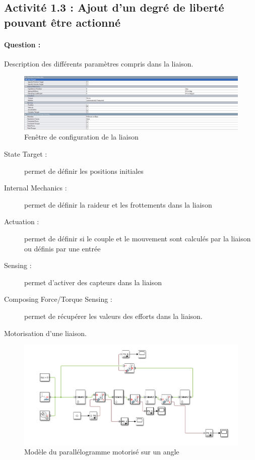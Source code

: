 \documentclass[12pt,a4paper]{article}
\begin{document}
\subsection{Activité 1.3 : Ajout d'un degré de liberté pouvant être actionné}
\paragraph{Question  : } Description des différents paramètres compris dans la liaison.
\begin{figure}[h!]
\centering
\includegraphics[width=.9\linewidth]{liaison.png}
\caption{Fenêtre de configuration de la liaison}
\end{figure}

\begin{description}
\item[State Target : ] permet de définir les positions initiales
\item[Internal Mechanics : ] permet de définir la raideur et les frottements dans la liaison
\item[Actuation : ] permet de définir si le couple et le mouvement sont calculés par la liaison ou définis par une entrée
\item[Sensing : ] permet d’activer des capteurs dans la liaison
\item[Composing Force/Torque Sensing : ] permet de récupérer les valeurs des efforts dans la liaison.
\end{description}

Motorisation d'une liaison.
\begin{figure}[h!]
\centering
\includegraphics[width=.9\linewidth]{motorise.png}
\caption{Modèle du parallélogramme motorisé sur un angle}
\end{figure}
\end{document}
